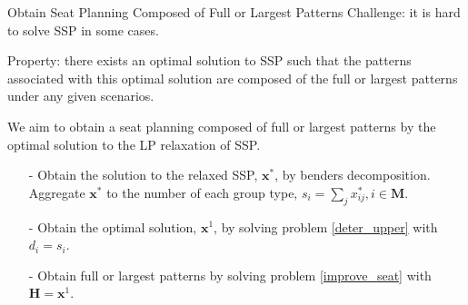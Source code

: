 \begin{frame}{Obtain Seat Planning Composed of Full or Largest Patterns}
  Challenge: it is hard to solve SSP in some cases. 
  \vspace{0.5cm}

  Property: there exists an optimal solution to SSP such that the patterns associated with this {\color{red} optimal solution} are composed of the {\color{red} full or largest patterns} under any given scenarios.
  \vspace{0.5cm}

  We aim to obtain a seat planning composed of full or largest patterns by the optimal solution to the LP relaxation of SSP.

  \begin{itemize}
    \item[-] Obtain the solution to the relaxed SSP, $\mathbf{x}^{*}$, by benders decomposition. Aggregate $\mathbf{x}^{*}$ to the number of each group type, ${s}_{i} =\sum_{j} x^{*}_{ij}, i \in \mathbf{M}$.

    \item[-] Obtain the optimal solution, $\mathbf{x}^{1}$, by solving problem \eqref{deter_upper} with $d_{i} = {s}_{i}$. 
     
    \item[-] Obtain full or largest patterns by solving problem \eqref{improve_seat} with $\bm{H} = \mathbf{x}^{1}$.
 \end{itemize}
\end{frame}
